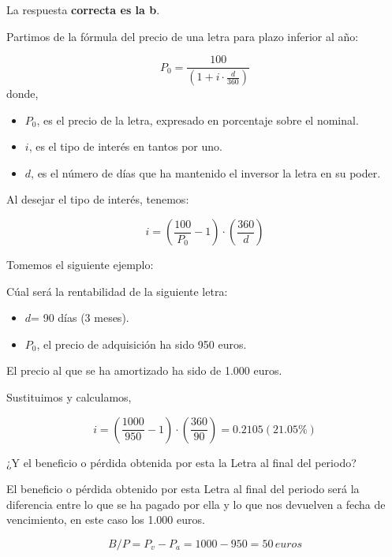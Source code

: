 \documentclass[
  letterpaper,
  DIV=11,
  numbers=noendperiod]{scrreprt}
\begin{document}
\begin{tcolorbox}[enhanced jigsaw, left=2mm, opacityback=0, colback=white, breakable, arc=.35mm, bottomrule=.15mm, rightrule=.15mm, toprule=.15mm, leftrule=.75mm, colframe=quarto-callout-tip-color-frame]
\begin{minipage}[t]{5.5mm}
\textcolor{quarto-callout-tip-color}{\faLightbulb}
\end{minipage}%
\begin{minipage}[t]{\textwidth - 5.5mm}

La respuesta \textbf{correcta es la b}.

Partimos de la fórmula del precio de una letra para plazo inferior al
año:

\[P_0=\frac{100}{\left(1+i\cdot\frac{d}{360}\right)}\] donde,

\begin{itemize}
\item
  \(P_0\), es el precio de la letra, expresado en porcentaje sobre el
  nominal.
\item
  \(i\), es el tipo de interés en tantos por uno.
\item
  \(d\), es el número de días que ha mantenido el inversor la letra en
  su poder.
\end{itemize}

Al desejar el tipo de interés, tenemos:

\[i=(\frac{100}{P_0}-1)\cdot(\frac{360}{d})\]

Tomemos el siguiente ejemplo:

Cúal será la rentabilidad de la siguiente letra:

\begin{itemize}
\item
  \(d\)= 90 días (3 meses).
\item
  \(P_0\), el precio de adquisición ha sido 950 euros.
\end{itemize}

El precio al que se ha amortizado ha sido de 1.000 euros.

Sustituimos y calculamos,

\[i=\left(\frac{1000}{950}-1\right)\cdot{\left(\frac{360}{90}\right)}=0.2105(21.05\%)\]

¿Y el beneficio o pérdida obtenida por esta la Letra al final del
periodo?

El beneficio o pérdida obtenido por esta Letra al final del periodo será
la diferencia entre lo que se ha pagado por ella y lo que nos devuelven
a fecha de vencimiento, en este caso los 1.000 euros.

\[B/P= P_v-P_a=1000-950=50\,euros\]

\end{minipage}%
\end{tcolorbox}
\end{document}
